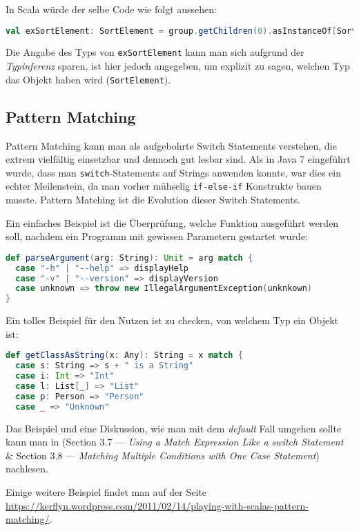 In Scala würde der selbe Code wie folgt aussehen:
\begin{lstlisting}[language=Scala,numbers=none,caption=Casting in Scala: Von Node zu SortElement]
val exSortElement: SortElement = group.getChildren(0).asInstanceOf[SortElement]
\end{lstlisting}

Die Angabe des Typs von \texttt{exSortElement} kann man sich aufgrund der \textit{Typinferenz} sparen, ist hier jedoch angegeben, um explizit zu sagen, welchen Typ das Objekt haben wird (\texttt{SortElement}).

\subsection{Pattern Matching}
Pattern Matching kann man als aufgebohrte Switch Statements verstehen, die extrem vielfältig einsetzbar und dennoch gut lesbar sind. Als in Java 7 eingeführt wurde, dass man \texttt{switch}-Statements auf Strings anwenden konnte, war dies ein echter Meilenstein, da man vorher mühselig \texttt{if-else-if} Konstrukte bauen musste. Pattern Matching ist die Evolution dieser Switch Statements.

Ein einfaches Beispiel ist die Überprüfung, welche Funktion ausgeführt werden soll, nachdem ein Programm mit gewissen Parametern gestartet wurde:

\begin{lstlisting}[language=Scala, caption=Pattern Matching mit Strings]
def parseArgument(arg: String): Unit = arg match {
  case "-h" | "--help" => displayHelp
  case "-v" | "--version" => displayVersion
  case unknown => throw new IllegalArgumentException(unknkown)
}
\end{lstlisting}

Ein tolles Beispiel für den Nutzen ist zu checken, von welchem Typ ein Objekt ist:
\begin{lstlisting}[language=Scala,caption=Type-Checking mit Pattern Matching]
def getClassAsString(x: Any): String = x match {
  case s: String => s + " is a String"
  case i: Int => "Int"
  case l: List[_] => "List"
  case p: Person => "Person"
  case _ => "Unknown"
\end{lstlisting}

Das Beispiel und eine Diskussion, wie man mit dem \textit{default} Fall umgehen sollte kann man in \cite{ScalaCookbook} (Section 3.7 --- \textit{Using a Match Expression Like a switch Statement} \& Section 3.8 --- \textit{Matching Multiple Conditions with One Case Statement}) nachlesen.

Einige weitere Beispiel findet man auf der Seite \url{https://kerflyn.wordpress.com/2011/02/14/playing-with-scalas-pattern-matching/}.
